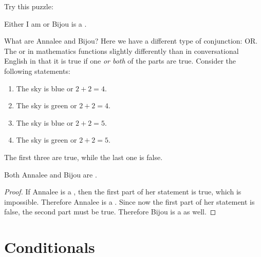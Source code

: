 \documentclass{tufte-book}
\begin{document}
Try this puzzle:
\begin{example}
  \begin{dialogue}
     Either I am \knave or Bijou is a \knight.
  \end{dialogue}
\end{example}
What are Annalee and Bijou? Here we have a different type of conjunction: OR. The or in mathematics functions slightly differently than in conversational English in that it is true if one \emph{or both} of the parts are true. Consider the following statements:
\begin{enumerate}
    \item The sky is blue or $2 + 2 = 4$.
    \item The sky is green or $2 + 2 = 4$.
    \item The sky is blue or $2 + 2 = 5$.
    \item The sky is green or $2 + 2 = 5$.
\end{enumerate}
The first three are true, while the last one is false. 

\begin{claim}
  Both Annalee and Bijou are \knights.
\end{claim}

\begin{proof}
  If Annalee is a \knave, then the first part of her statement is true, which is impossible. Therefore Annalee is a \knight. Since now the first part of her statement is false, the second part must be true. Therefore Bijou is a \knight as well.
\end{proof}



\section{Conditionals}
\label{sec:conditionals}
\end{document}
